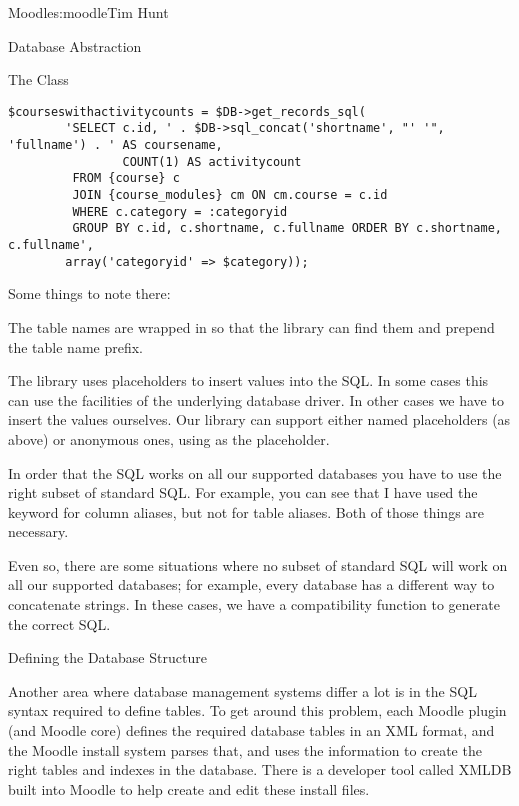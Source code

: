 \begin{aosachapter}{Moodle}{s:moodle}{Tim Hunt}
\begin{aosasect1}{Database Abstraction}
\begin{aosasect2}{The  Class}
\begin{verbatim}
$courseswithactivitycounts = $DB->get_records_sql(
        'SELECT c.id, ' . $DB->sql_concat('shortname', "' '", 'fullname') . ' AS coursename,
                COUNT(1) AS activitycount
         FROM {course} c
         JOIN {course_modules} cm ON cm.course = c.id
         WHERE c.category = :categoryid
         GROUP BY c.id, c.shortname, c.fullname ORDER BY c.shortname, c.fullname',
        array('categoryid' => $category));
\end{verbatim}

\noindent Some things to note there:

\begin{aosaenumerate}

\item The table names are wrapped in \code{\{\}} so that the library
  can find them and prepend the table name prefix.

\item The library uses placeholders to insert values into the SQL. In
  some cases this can use the facilities of the underlying database
  driver. In other cases we have to insert the values
  ourselves. Our library can support either named placeholders (as
  above) or anonymous ones, using  as the placeholder.

\item In order that the SQL works on all our supported databases you
  have to use the right subset of standard SQL. For example, you can
  see that I have used the  keyword for column aliases, but not for
  table aliases. Both of those things are necessary.

\item Even so, there are some situations where no subset of standard SQL
  will work on all our supported databases; for example, every
  database has a different way to concatenate strings. In these cases,
  we have a compatibility function to generate the correct SQL.

\end{aosaenumerate}

\end{aosasect2}

\begin{aosasect2}{Defining the Database Structure}

Another area where database management systems differ a lot is in the
SQL syntax required to define tables. To get around this problem, each
Moodle plugin (and Moodle core) defines the required database tables
in an XML format, and the Moodle install system parses that, and uses
the information to create the right tables and indexes in the
database. There is a developer tool called XMLDB built into Moodle to
help create and edit these install files.


\end{aosasect2}
\end{aosasect1}
\end{aosachapter}
